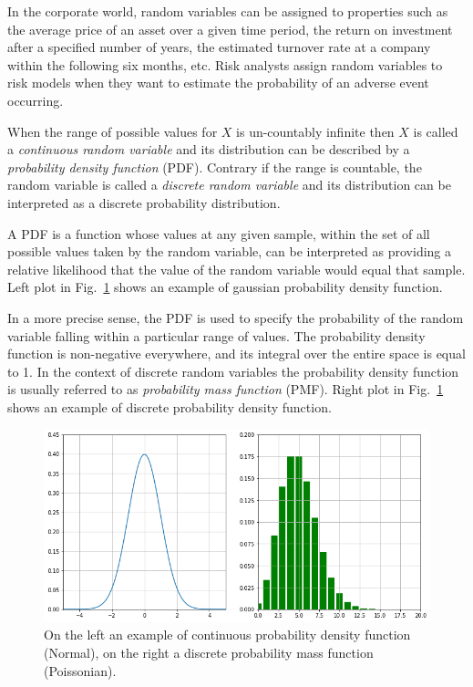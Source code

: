 In the corporate world, random variables can be assigned to properties such as the average price of an asset over a given time period, the return on investment after a specified number of years, the estimated turnover rate at a company within the following six months, etc. Risk analysts assign random variables to risk models when they want to estimate the probability of an adverse event occurring. 

When the range of possible values for \(X\) is un-countably infinite then \(X\) is called a \emph{continuous random variable} and its distribution can be described by a \emph{probability density function} (PDF). Contrary if the range is countable, the random variable is called a \emph{discrete random variable} and its distribution can be interpreted as a discrete probability distribution.

A PDF is a function whose values at any given sample, within the set of all possible values taken by the random variable, can be interpreted as providing a relative likelihood that the value of the random variable would equal that sample. Left plot in Fig.~\ref{fig:pdf_pmf} shows an example of gaussian probability density function.

In a more precise sense, the PDF is used to specify the probability of the random variable falling 
within a particular range of values. The probability density function is non-negative everywhere, and its integral over the entire space is equal to 1.
In the context of discrete random variables the probability density function is usually referred 
to as \emph{probability mass function} (PMF). Right plot in Fig.~\ref{fig:pdf_pmf} shows an example of discrete probability density function.

\begin{figure}[htb]
	\centering
	\includegraphics[width=1.\textwidth]{figures/pdf_pmf.png}
	\caption{On the left an example of continuous probability density function (Normal), on the right a discrete probability mass function (Poissonian).}
	\label{fig:pdf_pmf}
\end{figure}

